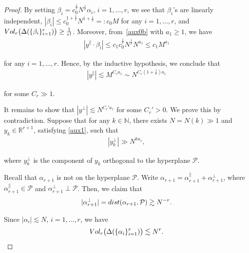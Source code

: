 \documentclass[10pt,a4paper]{amsart}
\newcommand{\Dl}{\Delta}
\newcommand{\N}{\mathbb{N}}
\newcommand{\R}{\mathbb{R}}
\newcommand{\al}{\alpha}
\newcommand{\be}{\beta}
\newcommand{\ges}{\gtrsim}
\newcommand{\les}{\lesssim}
\newcommand{\noi}{\noindent}
\begin{document}
\begin{proof}
\noi
By setting $\be_i = c_0^\frac 1r N^{\frac 1r} \al_i$, $i = 1, \dots, r$,
we see that $\be_i$'s are linearly independent,  
$|\be_i| \le c_0^{1 + \frac 1r} N^{1 + \frac 1r} =: c_0M$
for any 
$i = 1, \dots, r$,   and 
$\textup{Vol}_r
\big(\Dl(\{\be_i\}_{i = 1}^r)\big) \ge \frac1{r!}$.
Moreover, from~\eqref{aux0b} with $a_1 \ge 1$, we have 
\begin{align*}
|y^\parallel \cdot \be_i| \le c_1 c_0^\frac 1 r  N^\frac 1r N^{a_1}
\le c_1 M^{a_1}
\end{align*}

\noi
for any $i = 1, \dots, r$.
Hence, by the inductive hypothesis, we conclude that 
\begin{align}
|y^\parallel| \les M^{C_r a_1} \sim N^{C_r(1+ \frac 1r) a_1}
\label{YY2}
\end{align} 

\noi
for some $C_r \gg 1$.



It remains  to show that $|y^\perp| \les N^{C_r' a_1}$ for some $C_r' > 0$.
We prove this by contradiction.
Suppose that for any $k \in \N$, 
there exists $N = N(k) \gg1$ and $y_k\in \R^{r+1}$, satisfying
\eqref{aux1},  such that
\begin{align}
|y_k^\perp| \gg N^{ka_1},
\label{YY3} 
\end{align}

\noi
 where $y_k^\perp$ is the component of $y_k$ orthogonal to the hyperplane $\mathcal P$.





Recall that  $\al_{r+1}$ is not on the hyperplane $\mathcal P$.
Write $\al_{r+1} = \al_{r+1}^\parallel + \al_{r+1}^\perp$, 
where 
$\al_{r+1}^\parallel \in \mathcal P$ and $\al_{r+1}^\perp\perp \mathcal P$.
Then, 
 we claim that
\begin{align}\label{dist}
|\al_{r+1}^\perp| = {\rm dist} (\al_{r+1}, \mathcal P) \ges N^{-r}.
\end{align}

\noi
Since $ |\al_i| \les  N$, $i = 1, \dots, r$, 
we have 
\begin{align}
\textup{Vol}_r\big(\Dl(\{\al_i\}_{i = 1}^r)\big) \les N^r.
\label{YY4}
\end{align}



\end{proof}
\end{document}

